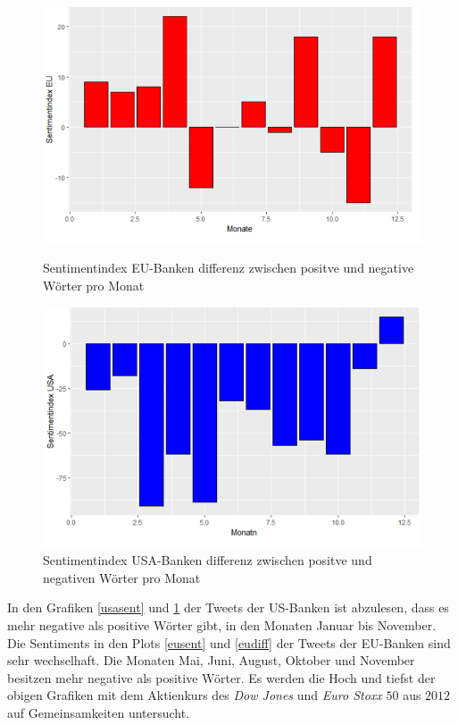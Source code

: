 \begin{figure}[H]
	\begin{minipage}[b]{.4\linewidth} %
	\includegraphics[width=1\textwidth]{Monateu.png}
	\caption{Sentimentindex EU-Banken differenz  zwischen positve und negative Wörter pro Monat}\label{eudiff}
\end{minipage}
	\hspace{.2\linewidth}
\begin{minipage}[b]{.4\linewidth} %
	\includegraphics[width=1\textwidth]{Monatusa.png}
	\caption{Sentimentindex USA-Banken differenz  zwischen positve und negativen Wörter pro Monat}\label{usadiff}
\end{minipage}
\end{figure}
In den Grafiken \ref{usasent} und \ref{usadiff} der Tweets der US-Banken  ist abzulesen, dass es mehr negative als positive Wörter gibt, in den Monaten Januar bis November. Die Sentiments in den Plots \ref{eusent} und \ref{eudiff} der Tweets der EU-Banken sind sehr wechselhaft. Die Monaten Mai, Juni, August, Oktober und November besitzen mehr negative als positive Wörter. Es werden die Hoch und tiefst der obigen Grafiken mit dem Aktienkurs des \textit{Dow Jones} und \textit{Euro Stoxx} $50$ aus $2012$ auf Gemeinsamkeiten untersucht. 
